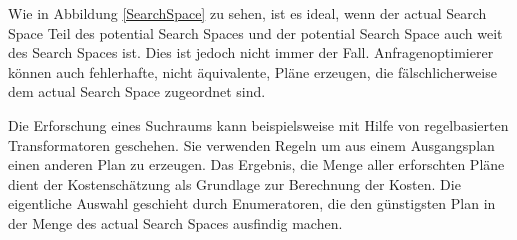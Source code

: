 Wie in Abbildung \ref{SearchSpace} zu sehen, ist es ideal, wenn der actual Search Space Teil des potential Search Spaces und der potential Search Space auch weit des Search Spaces ist. Dies ist jedoch nicht immer der Fall. Anfragenoptimierer können auch fehlerhafte, nicht äquivalente, Pläne erzeugen, die fälschlicherweise dem actual Search Space zugeordnet sind.

Die Erforschung eines Suchraums kann beispielsweise mit Hilfe von regelbasierten Transformatoren geschehen. Sie verwenden Regeln um aus einem Ausgangsplan einen anderen Plan zu erzeugen. Das Ergebnis, die Menge aller erforschten Pläne dient der Kostenschätzung als Grundlage zur Berechnung der Kosten. Die eigentliche Auswahl geschieht durch Enumeratoren, die den günstigsten Plan in der Menge des actual Search Spaces ausfindig machen.






